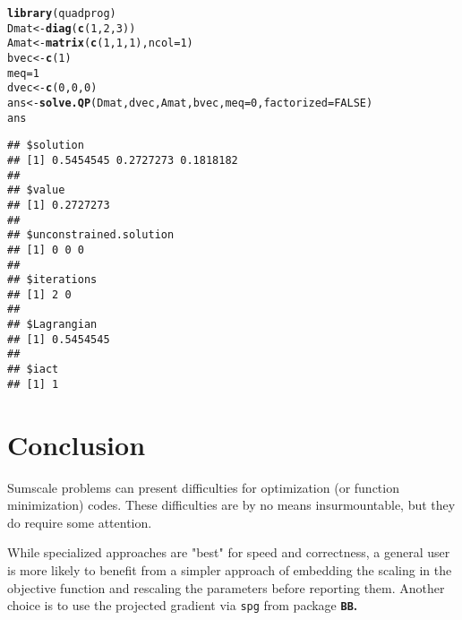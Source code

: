 \documentclass[11pt]{article}\usepackage[]{graphicx}\usepackage[]{color}
\makeatletter
\newcommand{\hlnum}[1]{\textcolor[rgb]{0.686,0.059,0.569}{#1}}%
\newcommand{\hlstd}[1]{\textcolor[rgb]{0.345,0.345,0.345}{#1}}%
\newcommand{\hlkwb}[1]{\textcolor[rgb]{0.69,0.353,0.396}{#1}}%
\newcommand{\hlkwc}[1]{\textcolor[rgb]{0.333,0.667,0.333}{#1}}%
\newcommand{\hlkwd}[1]{\textcolor[rgb]{0.737,0.353,0.396}{\textbf{#1}}}%
\newenvironment{kframe}{%
 \def\at@end@of@kframe{}%
 \ifinner\ifhmode%
  \def\at@end@of@kframe{\end{minipage}}%
  \begin{minipage}{\columnwidth}%
 \fi\fi%
 \def\FrameCommand##1{\hskip\@totalleftmargin \hskip-\fboxsep
 \colorbox{shadecolor}{##1}\hskip-\fboxsep
     \hskip-\linewidth \hskip-\@totalleftmargin \hskip\columnwidth}%
 \MakeFramed {\advance\hsize-\width
   \@totalleftmargin\z@ \linewidth\hsize
   \@setminipage}}%
 {\par\unskip\endMakeFramed%
 \at@end@of@kframe}
\newenvironment{knitrout}{}{} %
\newcommand{\code}[1]{{\tt#1}}
\newcommand{\pkg}[1]{\bf{\tt#1}\rm }
\makeatother
\begin{document}
\begin{knitrout}\scriptsize
{}\color{fgcolor}\begin{kframe}
\begin{alltt}
\hlkwd{library}\hlstd{(quadprog)}
\hlstd{Dmat}\hlkwb{<-}\hlkwd{diag}\hlstd{(}\hlkwd{c}\hlstd{(}\hlnum{1}\hlstd{,}\hlnum{2}\hlstd{,}\hlnum{3}\hlstd{))}
\hlstd{Amat}\hlkwb{<-}\hlkwd{matrix}\hlstd{(}\hlkwd{c}\hlstd{(}\hlnum{1}\hlstd{,} \hlnum{1}\hlstd{,} \hlnum{1}\hlstd{),} \hlkwc{ncol}\hlstd{=}\hlnum{1}\hlstd{)}
\hlstd{bvec}\hlkwb{<-}\hlkwd{c}\hlstd{(}\hlnum{1}\hlstd{)}
\hlstd{meq}\hlkwb{=}\hlnum{1}
\hlstd{dvec}\hlkwb{<-}\hlkwd{c}\hlstd{(}\hlnum{0}\hlstd{,} \hlnum{0}\hlstd{,} \hlnum{0}\hlstd{)}
\hlstd{ans}\hlkwb{<-}\hlkwd{solve.QP}\hlstd{(Dmat, dvec, Amat, bvec,} \hlkwc{meq}\hlstd{=}\hlnum{0}\hlstd{,} \hlkwc{factorized}\hlstd{=}\hlnum{FALSE}\hlstd{)}
\hlstd{ans}
\end{alltt}
\begin{verbatim}
## $solution
## [1] 0.5454545 0.2727273 0.1818182
## 
## $value
## [1] 0.2727273
## 
## $unconstrained.solution
## [1] 0 0 0
## 
## $iterations
## [1] 2 0
## 
## $Lagrangian
## [1] 0.5454545
## 
## $iact
## [1] 1
\end{verbatim}
\end{kframe}
\end{knitrout}



\section{Conclusion}

Sumscale problems can present difficulties for optimization (or function minimization)
codes. These difficulties are by no means insurmountable, but they do require some 
attention.

While specialized approaches are "best" for speed and correctness, a general user is more
likely to benefit from a simpler approach of embedding the scaling in the objective function
and rescaling the parameters before reporting them. Another choice is to use the projected
gradient via \code{spg} from package \pkg{BB}.




\end{document}
